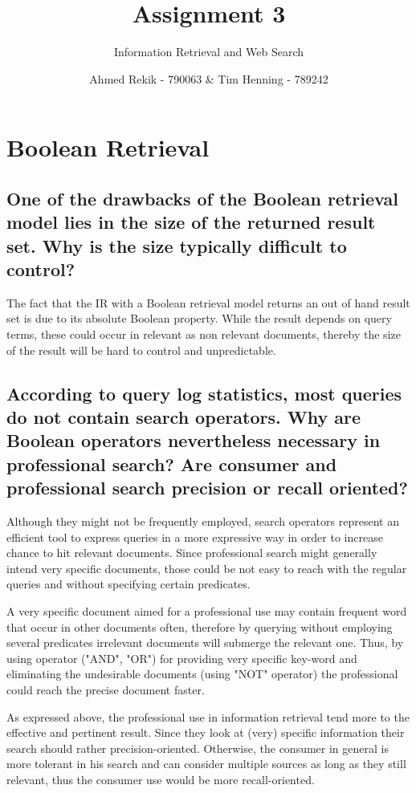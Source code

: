 \documentclass{scrartcl}
\title{Assignment 3}
\subtitle{Information Retrieval and Web Search}
\author{Ahmed Rekik - 790063 \& Tim Henning - 789242}
\begin{document}
\maketitle

\setcounter{section}{1}
\section{Boolean Retrieval}

\subsection{One of the drawbacks of the Boolean retrieval model lies in the size of the returned result
set. Why is the size typically difficult to control? }

The fact that the IR with a Boolean retrieval model returns an out of hand result set is due to its absolute Boolean property. While the result depends on query terms, these could occur in relevant as non relevant documents, thereby the size of the result will be hard to control and unpredictable.


\subsection{According to query log statistics, most queries do not contain search operators. Why are
Boolean operators nevertheless necessary in professional search? Are consumer and professional
search precision or recall oriented? }

Although they might not be frequently employed, search operators represent an efficient tool to express queries in a more expressive way in order to increase chance to hit relevant documents. Since professional search might generally intend very specific documents, those could be not easy to reach with the regular queries and without specifying certain predicates.

A very specific document aimed for a professional use may contain frequent word that occur in other documents often, therefore by querying without employing several predicates irrelevant documents will submerge the relevant one. Thus, by using operator ("AND", "OR") for providing very specific key-word and eliminating the undesirable documents (using "NOT" operator) the professional could reach the precise document faster.


As expressed above, the professional use in information retrieval tend more to the effective and pertinent result. Since they look at (very) specific information their search should rather precision-oriented. Otherwise, the consumer in general is more tolerant in his search and can consider multiple sources as long as they still relevant, thus the consumer use would be more recall-oriented.
\end{document}
